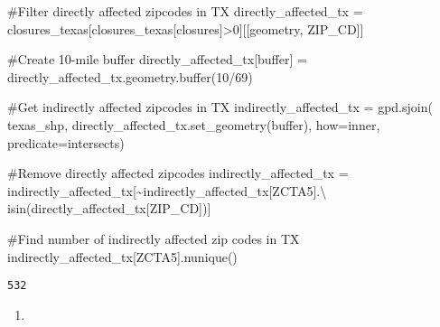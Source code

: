\documentclass[
  letterpaper,
  DIV=11,
  numbers=noendperiod]{scrartcl}
\newenvironment{Shaded}{\begin{snugshade}}{\end{snugshade}}
\newcommand{\BuiltInTok}[1]{\textcolor[rgb]{0.00,0.23,0.31}{#1}}
\newcommand{\CommentTok}[1]{\textcolor[rgb]{0.37,0.37,0.37}{#1}}
\newcommand{\DecValTok}[1]{\textcolor[rgb]{0.68,0.00,0.00}{#1}}
\newcommand{\NormalTok}[1]{\textcolor[rgb]{0.00,0.23,0.31}{#1}}
\newcommand{\OperatorTok}[1]{\textcolor[rgb]{0.37,0.37,0.37}{#1}}
\newcommand{\StringTok}[1]{\textcolor[rgb]{0.13,0.47,0.30}{#1}}
\providecommand{\tightlist}{%
  \setlength{\itemsep}{0pt}\setlength{\parskip}{0pt}}\usepackage{longtable,booktabs,array}
\begin{document}
\begin{Shaded}
\begin{Highlighting}[]
\CommentTok{\#Filter directly affected zipcodes in TX}
\NormalTok{directly\_affected\_tx }\OperatorTok{=}\NormalTok{ closures\_texas[closures\_texas[}\StringTok{\textquotesingle{}closures\textquotesingle{}}\NormalTok{]}\OperatorTok{\textgreater{}}\DecValTok{0}\NormalTok{][[}\StringTok{\textquotesingle{}geometry\textquotesingle{}}\NormalTok{, }\StringTok{\textquotesingle{}ZIP\_CD\textquotesingle{}}\NormalTok{]]}

\CommentTok{\#Create 10{-}mile buffer}
\NormalTok{directly\_affected\_tx[}\StringTok{\textquotesingle{}buffer\textquotesingle{}}\NormalTok{] }\OperatorTok{=}\NormalTok{ directly\_affected\_tx.geometry.}\BuiltInTok{buffer}\NormalTok{(}\DecValTok{10}\OperatorTok{/}\DecValTok{69}\NormalTok{)}

\CommentTok{\#Get indirectly affected zipcodes in TX}
\NormalTok{indirectly\_affected\_tx }\OperatorTok{=}\NormalTok{ gpd.sjoin(}
\NormalTok{    texas\_shp, directly\_affected\_tx.set\_geometry(}\StringTok{\textquotesingle{}buffer\textquotesingle{}}\NormalTok{), how}\OperatorTok{=}\StringTok{\textquotesingle{}inner\textquotesingle{}}\NormalTok{, predicate}\OperatorTok{=}\StringTok{\textquotesingle{}intersects\textquotesingle{}}\NormalTok{)}

\CommentTok{\#Remove directly affected zipcodes}
\NormalTok{indirectly\_affected\_tx }\OperatorTok{=}\NormalTok{ indirectly\_affected\_tx[}\OperatorTok{\textasciitilde{}}\NormalTok{indirectly\_affected\_tx[}\StringTok{\textquotesingle{}ZCTA5\textquotesingle{}}\NormalTok{].}\OperatorTok{\textbackslash{}}
\NormalTok{    isin(directly\_affected\_tx[}\StringTok{\textquotesingle{}ZIP\_CD\textquotesingle{}}\NormalTok{])]}

\CommentTok{\#Find number of indirectly affected zip codes in TX}
\NormalTok{indirectly\_affected\_tx[}\StringTok{\textquotesingle{}ZCTA5\textquotesingle{}}\NormalTok{].nunique()}
\end{Highlighting}
\end{Shaded}

\begin{verbatim}
532
\end{verbatim}

\begin{enumerate}
\def\labelenumi{\arabic{enumi}.}
\setcounter{enumi}{3}
\tightlist
\item
\end{enumerate}
\end{document}

